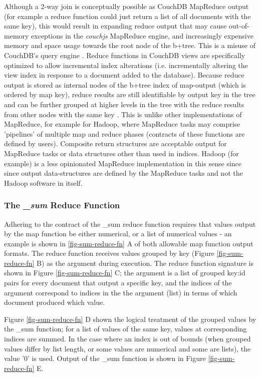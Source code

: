 Although a 2-way join is conceptually possible as CouchDB MapReduce output (for example a reduce function could just return a list of all documents with the same key), this would result in expanding reduce output that may cause out-of-memory exceptions in the \textit{couchjs} MapReduce engine, and increasingly expensive memory and space usage towards the root node of the b+tree. This is a misuse of CouchDB's query engine \cite{reduceFunctions}. Reduce functions in CouchDB views are specifically optimized to allow incremental index alterations (i.e. incrementally altering the view index in response to a document added to the database). Because reduce output is stored as internal nodes of the b+tree index of map-output (which is ordered by map key), reduce results are still identifiable by output key in the tree and can be further grouped at higher levels in the tree with the reduce results from other nodes with the same key \cite{slack25Oct}. This is unlike other implementations of MapReduce, for example for Hadoop, where MapReduce tasks may comprise 'pipelines' of multiple map and reduce phases (contracts of these functions are defined by users). Composite return structures are acceptable output for MapReduce tasks or data structures other than used in indices. Hadoop (for example) is a less opinionated MapReduce implementation in this sense since since output data-structures are defined by the MapReduce tasks and not the Hadoop software in itself.

\subsubsection{The \textit{\_sum} Reduce Function}
Adhering to the contract of the \_sum reduce function requires that values output by the map function be either numerical, or a list of numerical values - an example is shown in \ref{fig-sum-reduce-fn} A of both allowable map function output formats. The reduce function receives values grouped by key (Figure \ref{fig-sum-reduce-fn} B) as the  argument during execution. The reduce function signature is shown in Figure \ref{fig-sum-reduce-fn} C; the  argument is a list of grouped key:id pairs for every document that output a specific key, and the indices of the  argument correspond to indices in the the  argument (list) in terms of which document produced which value.

Figure \ref{fig-sum-reduce-fn} D shown the logical treatment of the grouped values by the \_sum function; for a list of values of the same key, values at corresponding indices are summed. In the case where an index is out of bounds (when grouped values differ by list length, or some values are numerical and some are lists), the value '0' is used. Output of the \_sum function is shown in Figure \ref{fig-sum-reduce-fn} E.

